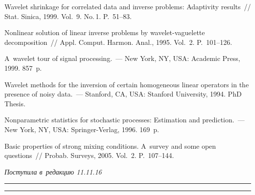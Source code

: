 \begin{multicols}{2}
{{\begin{thebibliography}{99}
 Wavelet shrinkage for correlated data and inverse problems: 
Adaptivity results~// Stat. Sinica, 1999. Vol.~9. No.\,1. P.~51--83.

 Nonlinear solution of linear inverse problems by wavelet-vaguelette 
decomposition~// Appl. Comput. Harmon. Anal., 1995. Vol.~2. P.~101--126.

 A~wavelet tour of signal processing.~--- New York, NY, USA:
Academic Press, 1999. 857~p.

 Wavelet methods for the inversion of certain homogeneous 
linear operators in the presence of noisy data.~--- Stanford, CA, USA:
Stanford University, 1994.
 PhD Thesis.

 Nonparametric statistics for stochastic processes: Estimation and 
prediction.~--- New York, NY, USA: Springer-Verlag, 1996. 169~p.

 Basic properties of strong mixing conditions. 
A~survey and some open questions~// Probab. Surveys, 2005. Vol.~2. P.~107--144.

 \end{thebibliography}

 }
 }

\end{multicols}

\vspace*{-3pt}

\hfill{\small\textit{Поступила в~редакцию 11.11.16}}

\vspace*{8pt}



\hrule

\vspace*{2pt}

\hrule



\def\tit{STRONG CONSISTENCY OF~THE~MEAN SQUARE RISK ESTIMATE IN~THE~INVERSE STATISTICAL 
PROBLEMS}

\def\titkol{Strong consistency of~the~mean square risk estimate in~the~inverse statistical 
problems}

\def\aut{O.\,V.~Shestakov$^{1,2}$}

\def\autkol{O.\,V.~Shestakov}

